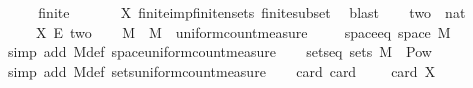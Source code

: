\begin{isabellebody}
%
\isadelimproof
%
\endisadelimproof
%
\isatagproof
{}\isamarkupfalse%
\ {\isacharminus}{\kern0pt}\isanewline
\ \ \isamarkupfalse%
\ {\isachardoublequoteopen}finite\ {\isasymF}{\isachardoublequoteclose}\isanewline
\ \ \ \ \isamarkupfalse%
\ X\ finite{\isacharunderscore}{\kern0pt}imp{\isacharunderscore}{\kern0pt}finite{\isacharunderscore}{\kern0pt}nsets\ finite{\isacharunderscore}{\kern0pt}subset\ \isamarkupfalse%
\ blast\isanewline
\ \ \isamarkupfalse%
\ {\isacharquery}{\kern0pt}two\ {\isacharequal}{\kern0pt}\ {\isachardoublequoteopen}{\isacharbraceleft}{\kern0pt}{\isachardot}{\kern0pt}{\isachardot}{\kern0pt}{\isacharless}{\kern0pt}{}{\isacharcolon}{\kern0pt}{\isacharcolon}{\kern0pt}nat{\isacharbraceright}{\kern0pt}{\isachardoublequoteclose}\isanewline
\ \ \isamarkupfalse%
\ {\isasymOmega}\ \ {\isachardoublequoteopen}{\isasymOmega}\ {\isasymequiv}\ X\ {\isasymrightarrow}\isactrlsub E\ {\isacharquery}{\kern0pt}two{\isachardoublequoteclose}\isanewline
\ \ \isamarkupfalse%
\ M\ \ {\isachardoublequoteopen}M\ {\isasymequiv}\ uniform{\isacharunderscore}{\kern0pt}count{\isacharunderscore}{\kern0pt}measure\ {\isasymOmega}{\isachardoublequoteclose}\isanewline
\ \ \isamarkupfalse%
\ space{\isacharunderscore}{\kern0pt}eq{\isacharcolon}{\kern0pt}\ {\isachardoublequoteopen}space\ M\ {\isacharequal}{\kern0pt}\ {\isasymOmega}{\isachardoublequoteclose}\isanewline
\ \ \ \ \isamarkupfalse%
\ {\isacharparenleft}{\kern0pt}simp\ add{\isacharcolon}{\kern0pt}\ M{\isacharunderscore}{\kern0pt}def\ space{\isacharunderscore}{\kern0pt}uniform{\isacharunderscore}{\kern0pt}count{\isacharunderscore}{\kern0pt}measure{\isacharparenright}{\kern0pt}\isanewline
\ \ \isamarkupfalse%
\ sets{\isacharunderscore}{\kern0pt}eq{\isacharcolon}{\kern0pt}\ {\isachardoublequoteopen}sets\ M\ {\isacharequal}{\kern0pt}\ Pow\ {\isasymOmega}{\isachardoublequoteclose}\isanewline
\ \ \ \ \isamarkupfalse%
\ {\isacharparenleft}{\kern0pt}simp\ add{\isacharcolon}{\kern0pt}\ M{\isacharunderscore}{\kern0pt}def\ sets{\isacharunderscore}{\kern0pt}uniform{\isacharunderscore}{\kern0pt}count{\isacharunderscore}{\kern0pt}measure{\isacharparenright}{\kern0pt}\isanewline
\ \ \isamarkupfalse%
\ card{\isasymOmega}{\isacharcolon}{\kern0pt}\ {\isachardoublequoteopen}card\ {\isasymOmega}\ {\isacharequal}{\kern0pt}\ {}\ {\isacharcircum}{\kern0pt}\ card\ X{\isachardoublequoteclose}\isanewline

\end{isabellebody}
